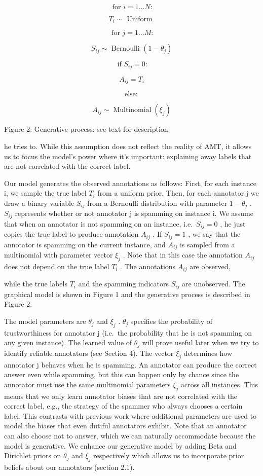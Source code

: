 \documentclass[
]{article}
\begin{document}
\[
\text { for } i = 1 \dots N:
\]

\[
T _ {i} \sim \text { Uniform }
\]

\[
\text { for } j = 1 \dots M:
\]

\[
S _ {i j} \sim \text { Bernoulli } (1 - \theta_ {j})
\]

\[
\text { if } S _ {i j} = 0:
\]

\[
A _ {i j} = T _ {i}
\]

\[
\mathrm{else}:
\]

\[
A _ {i j} \sim \operatorname{Multinomial} (\xi_ {j})
\]

Figure 2: Generative process: see text for description.

he tries to. While this assumption does not reflect the reality of AMT,
it allows us to focus the model's power where it's important: explaining
away labels that are not correlated with the correct label.

Our model generates the observed annotations as follows: First, for each
instance i, we sample the true label \(T_{i}\) from a uniform prior.
Then, for each annotator j we draw a binary variable \(S_{ij}\) from a
Bernoulli distribution with parameter \(1 - \theta_{j}\) . \(S_{ij}\)
represents whether or not annotator j is spamming on instance i. We
assume that when an annotator is not spamming on an instance,
i.e.~\(S_{ij} = 0\) , he just copies the true label to produce
annotation \(A_{ij}\) . If \(S_{ij} = 1\) , we say that the annotator is
spamming on the current instance, and \(A_{ij}\) is sampled from a
multinomial with parameter vector \(\xi_{j}\) . Note that in this case
the annotation \(A_{ij}\) does not depend on the true label \(T_{i}\) .
The annotations \(A_{ij}\) are observed,

while the true labels \(T_{i}\) and the spamming indicators \(S_{ij}\)
are unobserved. The graphical model is shown in Figure 1 and the
generative process is described in Figure 2.

The model parameters are \(\theta_{j}\) and \(\xi_{j}\) . \(\theta_{j}\)
specifies the probability of trustworthiness for annotator j (i.e.~the
probability that he is not spamming on any given instance). The learned
value of \(\theta_{j}\) will prove useful later when we try to identify
reliable annotators (see Section 4). The vector \(\xi_{j}\) determines
how annotator j behaves when he is spamming. An annotator can produce
the correct answer even while spamming, but this can happen only by
chance since the annotator must use the same multinomial parameters
\(\xi_{j}\) across all instances. This means that we only learn
annotator biases that are not correlated with the correct label, e.g.,
the strategy of the spammer who always chooses a certain label. This
contrasts with previous work where additional parameters are used to
model the biases that even dutiful annotators exhibit. Note that an
annotator can also choose not to answer, which we can naturally
accommodate because the model is generative. We enhance our generative
model by adding Beta and Dirichlet priors on \(\theta_{j}\) and
\(\xi_{j}\) respectively which allows us to incorporate prior beliefs
about our annotators (section 2.1).
\end{document}
